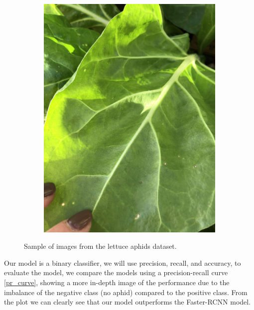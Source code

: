 \documentclass{article}
\begin{document}
\begin{figure}
\begin{subfigure}{0.4\textwidth}
        \includegraphics[width=\textwidth]{images/ds4.jpg}
    \end{subfigure}
    \caption{Sample of images from the lettuce aphids dataset.}
    \label{fig:dataset}
\end{figure}

Our model is a binary classifier, we will use precision, recall, and accuracy, to evaluate the model, we compare the models using a precision-recall curve \ref{pr_curve},
showing a more in-depth image of the performance due to the imbalance of the negative class (no aphid) compared to the positive class.
From the plot we can clearly see that our model outperforms the Faster-RCNN model.

\end{document}
